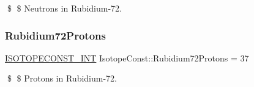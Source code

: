 \$ \$ Neutrons in Rubidium-\/72. \mbox{\label{group___isotope_const-_rubidium-_rb72_gac2136038b1ba05dcbab9887fb0dc2128}} 
\subsubsection{\texorpdfstring{Rubidium72\+Protons}{Rubidium72Protons}}
{\footnotesize\ttfamily \mbox{\hyperlink{group___isotope_const-_macros_ga5f18360b3e99483a35c32d789e62621c}{I\+S\+O\+T\+O\+P\+E\+C\+O\+N\+S\+T\+\_\+\+I\+NT}} Isotope\+Const\+::\+Rubidium72\+Protons = 37}

\$ \$ Protons in Rubidium-\/72. 
